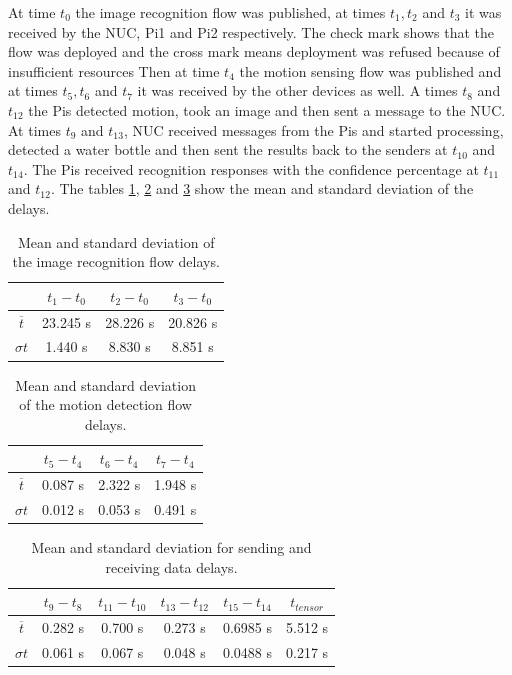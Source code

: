 \noindent At time $t_0$ the image recognition flow was published, at times $t_1, t_2$ and   $t_3$ it was received by the NUC, Pi1 and Pi2 respectively. The check mark shows that the flow was deployed and the cross mark means deployment was refused because of insufficient resources Then at time $t_4$ the motion sensing flow was published and at times $t_5,t_6$ and $t_7$ it was received by the other devices as well. A times $t_8$ and $t_{12}$  the Pis detected motion, took an image and then sent a message to the NUC. At times $t_9$ and $t_{13}$,  NUC received messages from the Pis and started processing, detected a water bottle and then sent the  results back to the senders at $t_{10}$ and $t_{14}$. The Pis received recognition responses with the confidence percentage at $t_{11}$ and $t_{12}$.  The tables \ref{table:tensor}, \ref{table:motion} and \ref{table:data} show the mean and standard deviation of the delays.  
\begin{table}[H]
\centering
\begin{tabular}{c|c|c|c}\toprule
&$t_1 - t_0$  & $t_2 - t_0$  & $t_3-t_0$ \\ \midrule
$ \overline{t} $&	23.245 s&28.226 s&20.826 s\\ 
$ \sigma t $ &1.440 s&8.830 s&8.851 s\\
\end{tabular}
\caption{Mean and standard deviation of the image recognition flow delays.}
\label{table:tensor}
\end{table}


\begin{table}[H]
\centering
\begin{tabular}{c|c|c|c}\toprule
&$t_5 - t_4$  & $t_6 - t_4$  & $t_7-t_4$ \\ \midrule
$ \overline{t} $ &0.087 s&2.322 s&1.948 s\\
$ \sigma t $&0.012 s&0.053 s&0.491 s\\
\end{tabular}
\caption{Mean and standard deviation of the motion detection flow delays.}
\label{table:motion}
\end{table}

\begin{table}[H]
\centering
\begin{tabular}{c|c|c|c|c|c}	\toprule
&$t_9 - t_8$  & $t_{11} - t_{10}$  & $t_{13}-t_{12}$ & $t_{15}-t_{14}$&  $t_{tensor}$ \\ \midrule
$ \overline{t} $&0.282 s&0.700 s&	0.273 s&0.6985 s&5.512 s\\
$ \sigma t $&0.061 s&0.067 s&	0.048 s&0.0488 s&0.217 s\\
	\end{tabular}
	\caption{Mean and standard deviation for sending and receiving data delays.}
	\label{table:data}
\end{table}

